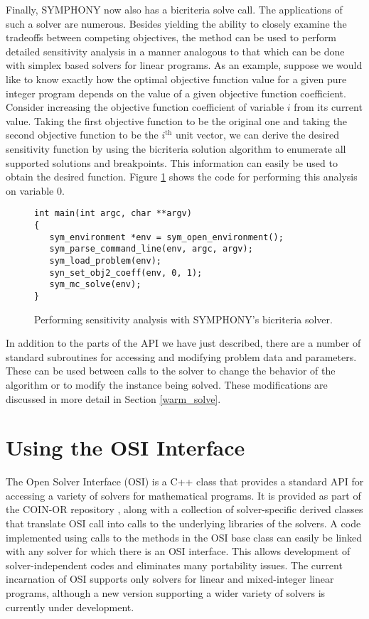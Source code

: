 Finally, SYMPHONY now also has a bicriteria solve call. The applications of
such a solver are numerous. Besides yielding the ability to closely examine
the tradeoffs between competing objectives, the method can be used to perform
detailed sensitivity analysis in a manner analogous to that which can be done
with simplex based solvers for linear programs. As an example, suppose we
would like to know exactly how the optimal objective function value for a
given pure integer program depends on the value of a given objective function
coefficient. Consider increasing the objective function
coefficient of variable $i$ from its current value. Taking the first objective
function to be the original one and taking the second objective function to be
the $i^\textrm{th}$ unit vector, we can derive the desired sensitivity
function by using the bicriteria solution algorithm to enumerate all supported
solutions and breakpoints. This information can easily be used to obtain the
desired function. Figure \ref{multi_criteria} shows the code for performing
this analysis on variable 0. 
\begin{figure}[tb]
\begin{Verbatim}[frame=lines]
int main(int argc, char **argv)
{
   sym_environment *env = sym_open_environment();
   sym_parse_command_line(env, argc, argv);
   sym_load_problem(env);
   syn_set_obj2_coeff(env, 0, 1);
   sym_mc_solve(env);
}
\end{Verbatim}
\caption{Performing sensitivity analysis with SYMPHONY's bicriteria solver.
\label{multi_criteria}}
\end{figure}

In addition to the parts of the API we have just described, there are a number
of standard subroutines for accessing and modifying problem data and
parameters. These can be used between calls to the solver to change the
behavior of the algorithm or to modify the instance being solved. These
modifications are discussed in more detail in Section \ref{warm_solve}.

\section{Using the OSI Interface}\label{OSI}

The Open Solver Interface (OSI) is a C++ class that provides a standard API
for accessing a variety of solvers for mathematical programs. It is provided
as part of the COIN-OR repository \cite{coin-or}, along with a collection of
solver-specific derived classes that translate OSI call into calls to the
underlying libraries of the solvers. A code implemented using calls to the
methods in the OSI base class can easily be linked with any solver for which
there is an OSI interface. This allows development of solver-independent codes
and eliminates many portability issues. The current incarnation of OSI
supports only solvers for linear and mixed-integer linear programs, although a
new version supporting a wider variety of solvers is currently under
development.

